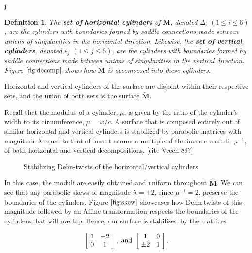j\documentclass[]{article}
\newtheorem{Def}{Definition}[subsection]
\begin{document}
\begin{Def}
The \textbf{set of horizontal cylinders} of $\tilde{\mathbf{M}}$, denoted $\Delta_{i}$ $(1\leq i \leq 6)$, are the cylinders with boundaries formed by saddle connections made between unions of singularities in the horizontal direction. \newline
Likewise, the \textbf{set of vertical cylinders}, denoted $\varepsilon_j$ $(1\leq j 
\leq 6)$, are the cylinders with boundaries formed by saddle connections made between unions of singularities in the vertical direction. \newline
Figure $\ref{fig:decomp}$ shows how $\tilde{\mathbf{M}}$ is decomposed into these cylinders.
\end{Def}

Horizontal and vertical cylinders of the surface are disjoint within their respective sets, and the union of both sets is the surface $\tilde{\mathbf{M}}$.

  Recall that the modulus of a cylinder, $\mu$, is given by the ratio of the cylinder's width to its circumference, $\mu{}={}w/c$. A surface that is composed entirely out of similar horizontal and vertical cylinders is stabilized by parabolic matrices with magnitude $\lambda$ equal to that of lowest common multiple of the inverse moduli, $\mu^{-1}$, of both horizontal and vertical decompositions. [cite Veech 89?]

\begin{figure}[H]
\centering

\caption{Stabilizing Dehn-twists of the horizontal/vertical cylinders}
\label{fig:skew}
\end{figure}

In this case, the moduli are easily obtained and uniform throughout $\tilde{\mathbf{M}}$. We can see that any parabolic skews of magnitude $\lambda=\pm2$, since $\mu^{-1}{}=2$, preserve the boundaries of the cylinders. Figure $\ref{fig:skew}$ showcases how Dehn-twists of this magnitude followed by an Affine transformation respects the boundaries of the cylinders that will overlap. Hence, our surface is stabilized by the matrices

\begin{equation}
\left[ \hspace{1mm} \begin{matrix}
				1 & \pm 2\\
				0 & 1
			\end{matrix}\hspace{1mm}\right],\text{ and }
			\left[ \hspace{1mm} \begin{matrix}
							1 & 0\\
							\pm 2 & 1
						\end{matrix}\hspace{1mm}\right].
\end{equation}
\end{document}
